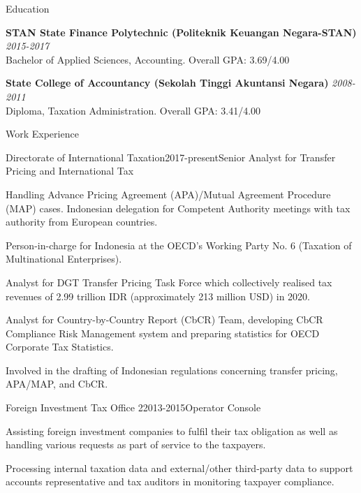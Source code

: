 \documentclass{resume}
\begin{document}
\begin{rSection}{Education}


{\bf STAN State Finance Polytechnic (Politeknik Keuangan Negara-STAN)} \hfill {\em 2015-2017} 
\\ Bachelor of Applied Sciences, Accounting.\hfill { Overall GPA: 3.69/4.00 }

{\bf State College of Accountancy (Sekolah Tinggi Akuntansi Negara)} \hfill {\em 2008-2011} 
\\ Diploma, Taxation Administration.\hfill { Overall GPA: 3.41/4.00 }

\end{rSection}

\begin{rSection}{Work Experience}
\begin{rSubsection}{Directorate of International Taxation}{2017-present}{Senior Analyst for Transfer Pricing and International Tax}{}
 \item Handling Advance Pricing Agreement (APA)/Mutual Agreement Procedure (MAP) cases. Indonesian delegation for Competent Authority meetings with tax authority from European countries.
 \item Person-in-charge for Indonesia at the OECD's Working Party No. 6 (Taxation of Multinational Enterprises).
 \item Analyst for DGT Transfer Pricing Task Force which collectively realised tax revenues of 2.99 trillion IDR (approximately 213 million USD) in 2020.
 \item Analyst for Country-by-Country Report (CbCR) Team, developing CbCR Compliance Risk Management system and preparing statistics for OECD Corporate Tax Statistics.
 \item Involved in the drafting of Indonesian regulations concerning transfer pricing, APA/MAP, and CbCR.
\end{rSubsection}
\begin{rSubsection}{Foreign Investment Tax Office 2}{2013-2015}{Operator Console}{}
 \item Assisting foreign investment companies to fulfil their tax obligation as well as handling various requests as part of service to the taxpayers.
 \item Processing internal taxation data and external/other third-party data to support accounts representative and tax auditors in monitoring taxpayer compliance.
\end{rSubsection}
\end{rSection}
\end{document}
